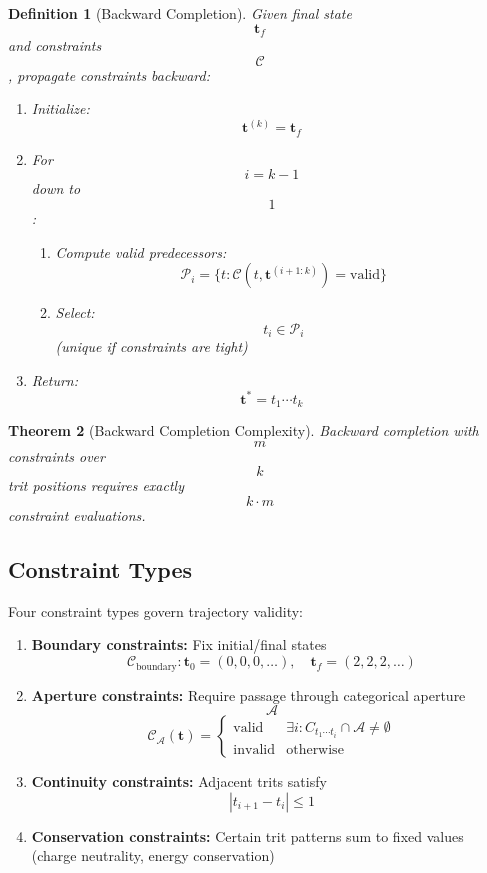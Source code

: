 \documentclass[11pt,twocolumn,a4paper]{article}
\newtheorem{theorem}{Theorem}[section]
\newtheorem{definition}[theorem]{Definition}
\theoremstyle{remark}
\begin{document}
\begin{definition}[Backward Completion]
\label{def:backward_completion}
Given final state $$\mathbf{t}_f$$ and constraints $$\mathcal{C}$$, propagate constraints backward:
\begin{enumerate}
\item Initialize: $$\mathbf{t}^{(k)} = \mathbf{t}_f$$
\item For $$i = k-1$$ down to $$1$$:
\begin{enumerate}
\item Compute valid predecessors: $$\mathcal{P}_i = \{t : \mathcal{C}(t, \mathbf{t}^{(i+1:k)}) = \text{valid}\}$$
\item Select: $$t_i \in \mathcal{P}_i$$ (unique if constraints are tight)
\end{enumerate}
\item Return: $$\mathbf{t}^* = t_1 \cdots t_k$$
\end{enumerate}
\end{definition}

\begin{theorem}[Backward Completion Complexity]
\label{thm:backward_complexity}
Backward completion with $$m$$ constraints over $$k$$ trit positions requires exactly $$k \cdot m$$ constraint evaluations.
\end{theorem}

\subsection{Constraint Types}

Four constraint types govern trajectory validity:

\begin{enumerate}
\item \textbf{Boundary constraints:} Fix initial/final states
$$
\mathcal{C}_{\mathrm{boundary}}: \mathbf{t}_0 = (0,0,0,\ldots), \quad \mathbf{t}_f = (2,2,2,\ldots)
$$

\item \textbf{Aperture constraints:} Require passage through categorical aperture $$\mathcal{A}$$
$$
\mathcal{C}_{\mathcal{A}}(\mathbf{t}) = \begin{cases}
\text{valid} & \exists i: C_{t_1 \cdots t_i} \cap \mathcal{A} \neq \emptyset \\
\text{invalid} & \text{otherwise}
\end{cases}
$$

\item \textbf{Continuity constraints:} Adjacent trits satisfy $$|t_{i+1} - t_i| \leq 1$$

\item \textbf{Conservation constraints:} Certain trit patterns sum to fixed values (charge neutrality, energy conservation)
\end{enumerate}
\end{document}
